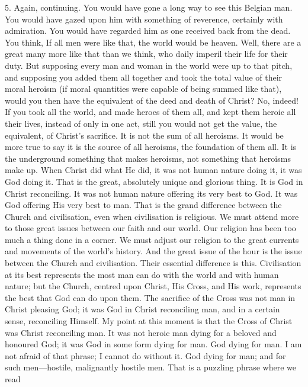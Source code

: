 \documentclass[12pt,letterpaper,oneside]{book}
\begin{document}
5. Again, continuing. You would have gone a 
long way to see this Belgian man. You would 
have gazed upon him with something of reverence, 
certainly with admiration. You would 
have regarded him as one received back from 
the dead. You think, If all men were like that, 
the world would be heaven. Well, there are a 
great many more like that than we think, who 
daily imperil their life for their duty. But 
supposing every man and woman in the world 
were up to that pitch, and supposing you added 
them all together and took the total value of 
their moral heroism (if moral quantities were 
capable of being summed like that), would you 
then have the equivalent of the deed and death 
of Christ? No, indeed! If you took all the 
world, and made heroes of them all, and kept 
them heroic all their lives, instead of only in one 
act, still you would not get the value, the equivalent, 
of Christ's sacrifice. It is not the sum of all 
heroisms. It would be more true to say it is the 
source of all heroisms, the foundation of them 
all. It is the underground something that makes 
heroisms, not something that heroisms make 
up. When Christ did what He did, it was not 
human nature doing it, it was God doing it. 
That is the great, absolutely unique and 
glorious thing. It is God in Christ reconciling. 
It was not human nature offering its very best 
to God. It was God offering His very best to 
man. That is the grand difference between the 
Church and civilisation, even when civilisation 
is religious. We must attend more to those 
great issues between our faith and our world. 
Our religion has been too much a thing done 
in a corner. We must adjust our religion to 
the great currents and movements of the 
world's history. And the great issue of the 
hour is the issue between the Church and 
civilisation. Their essential difference is this. 
Civilisation at its best represents the most 
man can do with the world and with human 
nature; but the Church, centred upon Christ, 
His Cross, and His work, represents the best 
that God can do upon them. The sacrifice 
of the Cross was not man in Christ pleasing 
God; it was God in Christ reconciling man, 
and in a certain sense, reconciling Himself. My 
point at this moment is that the Cross of Christ 
was Christ reconciling man. It was not heroic 
man dying for a beloved and honoured God; it
was God in some form dying for man. God 
dying for man. I am not afraid of that phrase; 
I cannot do without it. God dying for man; 
and for such men---hostile, malignantly hostile 
men. That is a puzzling phrase where we read 
\end{document}
